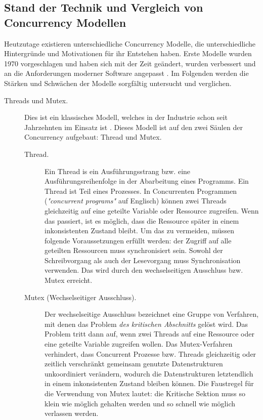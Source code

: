 \subsection{Stand der Technik und Vergleich von Concurrency Modellen}

Heutzutage existieren unterschiedliche Concurrency Modelle, die unterschiedliche Hintergründe und Motivationen für ihr Entstehen haben. Erste Modelle wurden 1970 vorgeschlagen und haben sich mit der Zeit geändert, wurden verbessert und an die Anforderungen moderner Software angepasst \cite{Andrews83conceptsand}. Im Folgenden werden die Stärken und Schwächen der Modelle sorgfältig untersucht und verglichen.

\begin{description} 
	\item[Threads und Mutex.] Dies ist ein klassisches Modell, welches in der Industrie schon seit Jahrzehnten im Einsatz ist \cite{Long10javaconcurrency}. Dieses Modell ist auf den zwei Säulen der Concurrency aufgebaut: Thread und Mutex.
	
	\begin{description} 
		\item[Thread.] Ein Thread is ein Ausführungsstrang bzw. eine Ausführungsreihenfolge in der Abarbeitung eines Programms. Ein Thread ist Teil eines Prozesses. In Concurrenten Programmen (\textit{"concurrent programs"} auf Englisch) können zwei Threads gleichzeitig auf eine geteilte Variable oder Ressource zugreifen. Wenn das passiert, ist es möglich, dass die Ressource später in einem inkonsistenten Zustand bleibt. Um das zu vermeiden, müssen folgende Voraussetzungen erfüllt werden: der Zugriff auf alle geteilten Ressourcen muss synchronisiert sein. Sowohl der Schreibvorgang als auch der Lesevorgang muss Synchronisation verwenden. Das wird durch den wechselseitigen Ausschluss bzw. Mutex erreicht.
		
		\item[Mutex (Wechselseitiger Ausschluss).] Der wechselseitige Ausschluss bezeichnet eine Gruppe von Verfahren, mit denen das Problem \textit{des kritischen Abschnitts} gelöst wird. Das Problem tritt dann auf, wenn zwei Threads auf eine Ressource oder eine geteilte Variable zugreifen wollen. Das Mutex-Verfahren verhindert, dass Concurrent Prozesse bzw. Threads gleichzeitig oder zeitlich verschränkt gemeinsam genutzte Datenstrukturen unkoordiniert verändern, wodurch die Datenstrukturen letztendlich in einem inkonsistenten Zustand bleiben können. Die Faustregel für die Verwendung von Mutex lautet: die Kritische Sektion muss so klein wie möglich gehalten werden und so schnell wie möglich verlassen werden.	
	\end{description}
	

\end{description}
